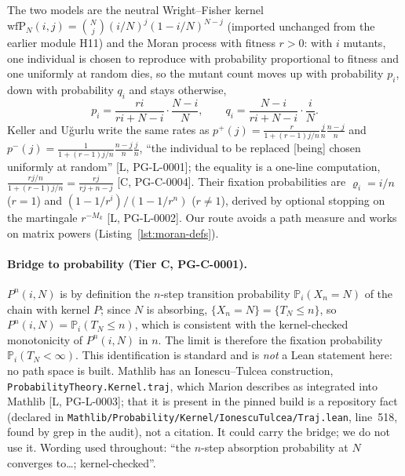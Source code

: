 \documentclass[11pt]{article}
\theoremstyle{remark}
\newcommand{\tier}[1]{\textsf{[#1]}}
\newcommand{\lean}[1]{\texttt{#1}}
\newcommand{\Pn}{P^{n}}
\begin{document}
The two models are the neutral Wright--Fisher kernel $\mathrm{wfP}_N(i,j)=\binom Nj(i/N)^j(1-i/N)^{N-j}$ (imported unchanged
from the earlier module H11) and the Moran process with fitness $r>0$: with $i$ mutants, one individual is chosen to
reproduce with probability proportional to fitness and one uniformly at random dies, so the mutant count moves up with
probability $p_i$, down with probability $q_i$ and stays otherwise,
\[
p_i=\frac{r i}{r i+N-i}\cdot\frac{N-i}{N},\qquad q_i=\frac{N-i}{r i+N-i}\cdot\frac{i}{N}.
\]
Keller and U\u{g}urlu write the same rates as $p^{+}(j)=\frac{r}{1+(r-1)j/n}\frac jn\frac{n-j}n$ and
$p^{-}(j)=\frac{1}{1+(r-1)j/n}\frac{n-j}n\frac jn$, ``the individual to be replaced [being] chosen uniformly at random''
\tier{L, PG-L-0001}; the equality is a one-line computation, $\frac{r j/n}{1+(r-1)j/n}=\frac{r j}{rj+n-j}$
\tier{C, PG-C-0004}. Their fixation probabilities are $\varrho_i=i/n$ ($r=1$) and
$(1-1/r^{i})/(1-1/r^{n})$ ($r\ne1$), derived by optional stopping on the martingale $r^{-M_k}$ \tier{L, PG-L-0002}.
Our route avoids a path measure and works on matrix powers (Listing~\ref{lst:moran-defs}).



\paragraph{Bridge to probability (Tier C, PG-C-0001).} $\Pn(i,N)$ is by definition the $n$-step transition probability
$\mathbb P_i(X_n=N)$ of the chain with kernel $P$; since $N$ is absorbing, $\{X_n=N\}=\{T_N\le n\}$, so
$\Pn(i,N)=\mathbb P_i(T_N\le n)$, which is consistent with the kernel-checked monotonicity of $\Pn(i,N)$ in $n$. The limit is
therefore the fixation probability $\mathbb P_i(T_N<\infty)$. This identification is standard and is \emph{not} a
Lean statement here: no path space is built. Mathlib has an Ionescu--Tulcea construction, \lean{ProbabilityTheory.Kernel.traj}, which Marion describes as integrated into Mathlib
\tier{L, PG-L-0003}; that it is present in the pinned build is a repository fact (declared in \texttt{Mathlib/Probability/Kernel/IonescuTulcea/Traj.lean}, line~518, found by
grep in the audit), not a citation. It could carry the bridge; we do not use it. Wording used throughout: ``the $n$-step absorption probability
at $N$ converges to\dots; kernel-checked''.
\end{document}
